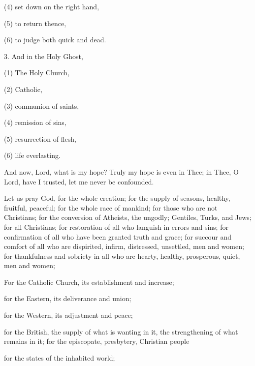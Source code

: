 (4) set down on the right hand,

(5) to return thence,

(6) to judge both quick and dead.

3. And in the Holy Ghost,

(1) The Holy Church,

(2) Catholic,

(3) communion of saints,

(4) remission of sins,

(5) resurrection of flesh,

(6) life everlasting.

And now, Lord, what is my hope? Truly my hope is even in Thee; in Thee, O Lord, have I trusted, let me never be confounded.


Let us pray God, for the whole creation; for the supply of seasons, healthy, fruitful, peaceful; for the whole race of mankind; for those who are not Christians; for the conversion of Atheists, the ungodly; Gentiles, Turks, and Jews;  for all Christians; for restoration of all who languish in errors and sins; for confirmation of all who have been granted truth and grace; for succour and comfort of all who are dispirited, infirm, distressed, unsettled, men and women; for thankfulness and sobriety in all who are hearty, healthy, prosperous, quiet, men and women;

For the Catholic Church, its establishment and increase;

for the Eastern, its deliverance and union;

for the Western, its adjustment and peace;

for the British, the supply of what is wanting in it, the strengthening of what remains in it; for the episcopate, presbytery, Christian people

for the states of the inhabited world;

